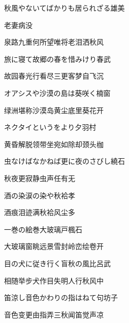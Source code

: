 \begin{haiku}
    {\FH 秋風やないてばかりも居られざる}\hfill{\FH 雄美}

    {\FK 老妻病没}

    {\FK 泉路九重何所望唯将老泪洒秋风}
\end{haiku}

\begin{haiku}
    {\FH 旅に寝て故郷の春を惜みけり}\hfill{\FH 春武}

    {\FK 故园春光行看尽三更客梦自飞沉}
\end{haiku}

\begin{haiku}
    {\FH オアシスや沙漠の島は葵咲く}\hfill{\FH 楠窗}

    {\FK 绿洲堪称沙漠岛黄尘底里葵花开}
\end{haiku}

\begin{haiku}
    {\FH ネクタイというをより夕}\hfill{\FH 羽村}

    {\FK 黄昏解脱领带坐宛如除却颈头枷}
\end{haiku}

\begin{haiku}
    {\FH 虫なけばなかねば更に夜のさびし}\hfill{\FH 繞石}

    {\FK 秋夜更寂静虫声任有无}
\end{haiku}

\begin{haiku}
    {\FH 酒の染涙の染や秋袷}\hfill{\FH 孝}

    {\FK 酒痕泪迹满秋袷风尘多}
\end{haiku}

\begin{haiku}
    {\FH 一巻の絵巻大玻璃戸}\hfill{\FH 楓石}

    {\FK 大玻璃窗眺远景雪封岭峦绘卷开}
\end{haiku}

\begin{haiku}
    {\FH 目の犬に従き行く盲秋の風}\hfill{\FH 比呂武}

    {\FK 相随举步犬作目失明人行秋风中}
\end{haiku}

\begin{haiku}
    {\FH 笛涼し音色かわりの指はねて}\hfill{\FH 句坊子}

    {\FK 音色变更由指弄三秋闻笛觉声凉}
\end{haiku}

